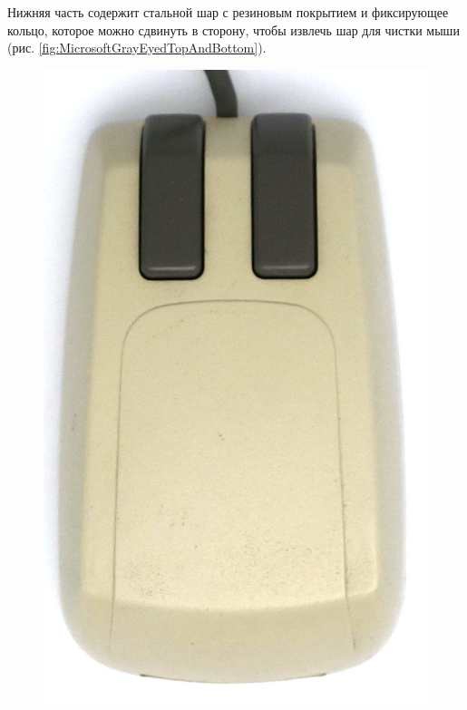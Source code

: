 \documentclass[11pt, a4paper]{article}
\begin{document}
Нижняя часть содержит стальной шар с резиновым покрытием и фиксирующее кольцо, которое можно сдвинуть в сторону, чтобы извлечь шар для чистки мыши (рис. \ref{fig:MicrosoftGrayEyedTopAndBottom}).

\begin{figure}[h]
    \centering
    \includegraphics[scale=0.55]{1985_microsoft_gray_eyed_mouse/top_30.jpg}

\end{figure}
\end{document}
